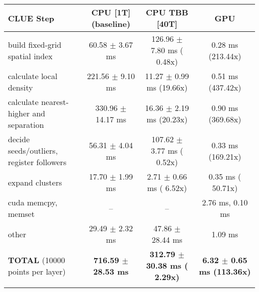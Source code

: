     \begin{tabular}{l|c|c|c}
    \hline
    CLUE Step                                 & CPU [1T] (baseline)         & CPU TBB [40T]                         & GPU                       \\ \hline
    build fixed-grid spatial index            &  60.58 $\pm$  3.67 ms       & 126.96 $\pm$  7.80 ms ( 0.48x)        &   0.28 ms (213.44x)       \\
    calculate local density                   & 221.56 $\pm$  9.10 ms       &  11.27 $\pm$  0.99 ms (19.66x)        &   0.51 ms (437.42x)       \\
    calculate nearest-higher and separation   & 330.96 $\pm$ 14.17 ms       &  16.36 $\pm$  2.19 ms (20.23x)        &   0.90 ms (369.68x)       \\
    decide seeds/outliers, register followers &  56.31 $\pm$  4.04 ms       & 107.62 $\pm$  3.77 ms ( 0.52x)        &   0.33 ms (169.21x)       \\
    expand clusters                           &  17.70 $\pm$  1.99 ms       &   2.71 $\pm$  0.66 ms ( 6.52x)        &   0.35 ms ( 50.71x)       \\ \hline
    cuda memcpy, memset                       & --                          & --                                    &   2.76 ms,   0.10 ms      \\ 
    other                                     &  29.49 $\pm$  2.32 ms       &  47.86 $\pm$ 28.44 ms                 &   1.09 ms                 \\ \hline
    \textbf{TOTAL} (10000 points per layer)   & \textbf{716.59 $\pm$ 28.53 ms} & \textbf{312.79 $\pm$ 30.38 ms ( 2.29x)} & \textbf{  6.32 $\pm$  0.65 ms (113.36x)}  \\
    \hline
    \multicolumn{4}{c}{} 
    \end{tabular}
    \linebreak


